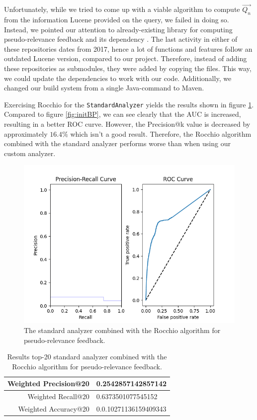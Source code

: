 \documentclass[11pt]{article}
\begin{document}
Unfortunately, while we tried to come up with a viable algorithm to compute $\overrightarrow{Q_n}$ from the information Lucene provided on the query, we failed in doing so. Instead, we pointed our attention to already-existing library for computing pseudo-relevance feedback \cite{rocchio} and its dependency \cite{glis}. The last activity in either of these repositories dates from 2017, hence a lot of functions and features follow an outdated Lucene version, compared to our project. Therefore, instead of adding these repositories as submodules, they were added by copying the files. This way, we could update the dependencies to work with our code. Additionally, we changed our build system from a single Java-command to Maven.

Exercising \textsf{Rocchio} for the \texttt{StandardAnalyzer} yields the results shown in figure \ref{fig:rocchio-standard}. Compared to figure \ref{fig:initBP}, we can see clearly that the AUC is increased, resulting in a better ROC curve. However, the \textsf{Precision@k} value is decreased by approximately $16.4\%$ which isn't a good result.  Therefore, the \textsf{Rocchio} algorithm combined with the standard analyzer performs worse than when using our custom analyzer.

\begin{figure}[htp]
	\centering
	\includegraphics[width=\textwidth]{images/rocchio-standard}
	\caption{The standard analyzer combined with the \textsf{Rocchio} algorithm for pseudo-relevance feedback.}
	\label{fig:rocchio-standard}
\end{figure}

\begin{table}[htp]
	\centering
	\begin{tabular}{|r|l|}
		\hline
		Weighted \textsf{Precision@20} & 0.2542857142857142 \\ \hline
		Weighted \textsf{Recall@20} & 0.6373501077545152 \\ \hline
		Weighted \textsf{Accuracy@20} & 0.0.10271136159409343 \\ \hline
	\end{tabular}
	\caption{Results top-20 standard analyzer combined with the \textsf{Rocchio} algorithm for pseudo-relevance feedback.}
	\label{tbl:atk-rocc}
\end{table}
\end{document}
